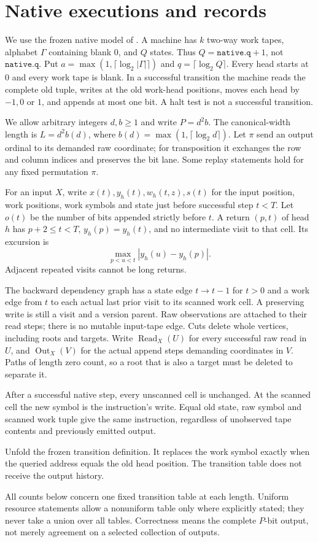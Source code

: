 \section{Native executions and records}\label{sec:model}

We use the frozen native model of \cite{FirstPaper2026}. A machine has $k$
two-way work tapes, alphabet $\Gamma$ containing blank $0$, and $Q$ states.
Thus $Q=\texttt{native.q}+1$, not $\texttt{native.q}$. Put
$a=\max(1,\lceil\log_2|\Gamma|\rceil)$ and
$q=\lceil\log_2 Q\rceil$. Every head starts at $0$ and every work tape is
blank. In a successful transition the machine reads the complete old tuple,
writes at the old work-head positions, moves each head by $-1,0$ or $1$, and
appends at most one bit. A halt test is not a successful transition.

We allow arbitrary integers $d,b\ge1$ and write $P=d^2b$. The canonical-width
length is $L=d^2b(d)$, where $b(d)=\max(1,\lceil\log_2d\rceil)$.
Let $\pi$ send an output ordinal to its demanded raw coordinate; for
transposition it exchanges the row and column indices and preserves the bit
lane. Some replay statements hold for any fixed permutation $\pi$.

For an input $X$, write $x(t),y_h(t),w_h(t,z),s(t)$ for the input position,
work positions, work symbols and state just before successful step $t<T$.
Let $o(t)$ be the number of bits appended strictly before $t$. A return
$(p,t)$ of head $h$ has $p+2\le t<T$, $y_h(p)=y_h(t)$, and no intermediate
visit to that cell. Its excursion is
\[
 \max_{p<u<t}|y_h(u)-y_h(p)|.
\]
Adjacent repeated visits cannot be long returns.

The backward dependency graph has a state edge $t\to t-1$ for $t>0$ and a
work edge from $t$ to each actual last prior visit to its scanned work cell.
A preserving write is still a visit and a version parent. Raw observations
are attached to their read steps; there is no mutable input-tape edge.
Cuts delete whole vertices, including roots and targets. Write
$\operatorname{Read}_X(U)$ for every successful raw read in $U$, and
$\operatorname{Out}_X(V)$ for the actual append steps demanding coordinates
in $V$. Paths of length zero count, so a root that is also a target must be
deleted to separate it.

\begin{lemma}\label{lem:old-write}
After a successful native step, every unscanned cell is unchanged. At the
scanned cell the new symbol is the instruction's write. Equal old state,
raw symbol and scanned work tuple give the same instruction, regardless of
unobserved tape contents and previously emitted output.
\end{lemma}
\begin{outline}
Unfold the frozen transition definition. It replaces the work symbol exactly
when the queried address equals the old head position. The transition table
does not receive the output history.
\end{outline}

All counts below concern one fixed transition table at each length. Uniform
resource statements allow a nonuniform table only where explicitly stated;
they never take a union over all tables. Correctness means the complete
$P$-bit output, not merely agreement on a selected collection of outputs.

